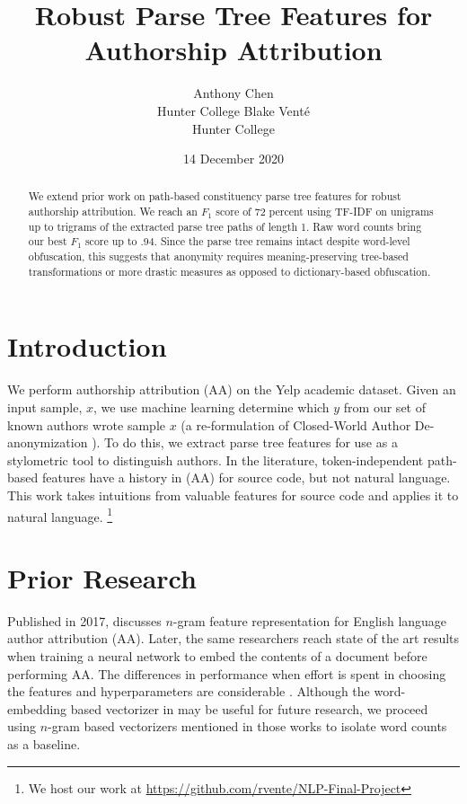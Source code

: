 \documentclass[11pt,a4paper]{article}
\title{Robust Parse Tree Features for Authorship Attribution}
\author{Anthony Chen \\ Hunter College \And Blake Vent\'e \\ Hunter College}
\date{14 December 2020}
\begin{document}
\maketitle


\begin{abstract}
We extend prior work on path-based constituency parse tree features for robust authorship attribution. We reach an $F_1$ score of 72 percent using TF-IDF on unigrams up to trigrams of the extracted parse tree paths of length 1. Raw word counts bring our best $F_1$ score up to .94. Since the parse tree remains intact despite word-level obfuscation, this suggests that anonymity requires meaning-preserving tree-based transformations or more drastic measures as opposed to dictionary-based obfuscation.
\end{abstract}


\section{Introduction}

We perform authorship attribution (AA) on the Yelp academic dataset. Given an input sample, $x$, we use machine learning
determine which $y$ from our set of known authors wrote sample $x$ (a re-formulation of Closed-World Author De-anonymization \cite[2]{caliskan2015}). To do this, we extract parse tree features for use as a stylometric tool to distinguish authors. In the literature, token-independent path-based features have a history in (AA) for source code, but not natural language. This work takes intuitions from valuable features for source code and applies it to natural language. \footnote{We host our work at \url{https://github.com/rvente/NLP-Final-Project} }

\section{Prior Research}

Published in 2017, \citeauthor{sari-etal-2017-continuous} discusses $n$-gram feature representation for English language author attribution (AA). Later, the same researchers reach state of the art results when training a neural network to embed the contents of a document before performing AA. The differences in performance when effort is spent in choosing the features and hyperparameters are considerable \cite[9]{sari-etal-2018-topic}. Although the word-embedding based vectorizer in \cite{sari-etal-2017-continuous} may be useful for future research, we proceed using $n$-gram based vectorizers mentioned in those works to isolate word counts as a baseline.
\end{document}

